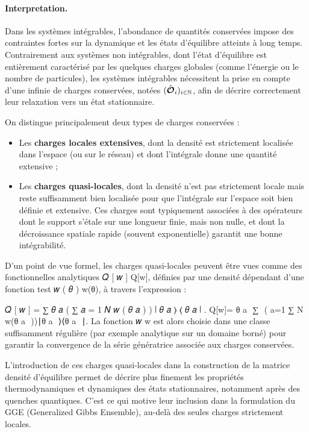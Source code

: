 \paragraph{Interpretation.}
Dans les systèmes intégrables, l'abondance de quantités conservées impose des contraintes fortes sur la dynamique et les états d'équilibre atteints à long temps. Contrairement aux systèmes non intégrables, dont l’état d’équilibre est entièrement caractérisé par les quelques charges globales (comme l’énergie ou le nombre de particules), les systèmes intégrables nécessitent la prise en compte d’une {\bffamille infinie de  charges conservées}, notées $(\hat{\bm{\mathcal{O}}}_i)_{i\in \mathbb{N}}$, afin de décrire correctement leur relaxation vers un état stationnaire.

On distingue principalement deux types de charges conservées :
\begin{itemize}[label = $\bullet$]
	\item Les {\bf charges locales extensives}, dont la densité est strictement localisée dans l’espace (ou sur le réseau) et dont l’intégrale donne une quantité extensive ;
	\item Les {\bf charges quasi-locales}, dont la densité n’est pas strictement locale mais reste suffisamment bien localisée pour que l’intégrale sur l’espace soit bien définie et extensive. Ces charges sont typiquement associées à des opérateurs dont le support s'étale sur une longueur finie, mais non nulle, et dont la décroissance spatiale rapide (souvent exponentielle) garantit une bonne intégrabilité.
\end{itemize}


D’un point de vue formel, les charges quasi-locales peuvent être vues comme des fonctionnelles analytiques 
𝑄
[
𝑤
]
Q[w], définies par une densité dépendant d’une fonction test 
𝑤
(
𝜃
)
w(θ), à travers l’expression :

𝑄
[
𝑤
]
=
∑
{
𝜃
𝑎
}
(
∑
𝑎
=
1
𝑁
𝑤
(
𝜃
𝑎
)
)
∣
{
𝜃
𝑎
}
⟩
⟨
{
𝜃
𝑎
}
∣
.
Q[w]= 
{θ 
a
​
 }
∑
​
 ( 
a=1
∑
N
​
 w(θ 
a
​
 ))∣{θ 
a
​
 }⟩⟨{θ 
a
​
 }∣.
La fonction 
𝑤
w est alors choisie dans une classe suffisamment régulière (par exemple analytique sur un domaine borné) pour garantir la convergence de la série génératrice associée aux charges conservées.

L’introduction de ces charges quasi-locales dans la construction de la matrice densité d’équilibre permet de décrire plus finement les propriétés thermodynamiques et dynamiques des états stationnaires, notamment après des quenches quantiques. C’est ce qui motive leur inclusion dans la formulation du GGE (Generalized Gibbs Ensemble), au-delà des seules charges strictement locales.
